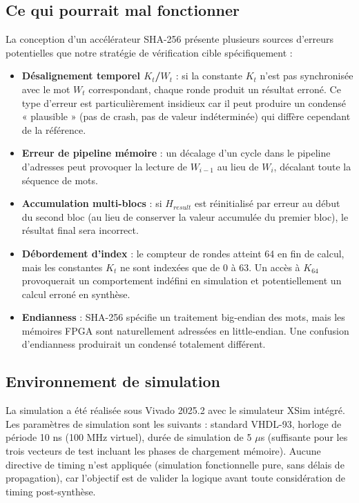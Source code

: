 \subsection{Ce qui pourrait mal fonctionner}

La conception d'un accélérateur SHA-256 présente plusieurs sources d'erreurs potentielles que notre stratégie de vérification cible spécifiquement :

\begin{itemize}
    \item \textbf{Désalignement temporel $K_t$/$W_t$} : si la constante $K_t$ n'est pas synchronisée avec le mot $W_t$ correspondant, chaque ronde produit un résultat erroné. Ce type d'erreur est particulièrement insidieux car il peut produire un condensé « plausible » (pas de crash, pas de valeur indéterminée) qui diffère cependant de la référence.
    \item \textbf{Erreur de pipeline mémoire} : un décalage d'un cycle dans le pipeline d'adresses peut provoquer la lecture de $W_{i-1}$ au lieu de $W_i$, décalant toute la séquence de mots.
    \item \textbf{Accumulation multi-blocs} : si $H_{result}$ est réinitialisé par erreur au début du second bloc (au lieu de conserver la valeur accumulée du premier bloc), le résultat final sera incorrect.
    \item \textbf{Débordement d'index} : le compteur de rondes atteint 64 en fin de calcul, mais les constantes $K_t$ ne sont indexées que de 0 à 63. Un accès à $K_{64}$ provoquerait un comportement indéfini en simulation et potentiellement un calcul erroné en synthèse.
    \item \textbf{Endianness} : SHA-256 spécifie un traitement big-endian des mots, mais les mémoires FPGA sont naturellement adressées en little-endian. Une confusion d'endianness produirait un condensé totalement différent.
\end{itemize}

\subsection{Environnement de simulation}

La simulation a été réalisée sous Vivado 2025.2 avec le simulateur XSim intégré. Les paramètres de simulation sont les suivants : standard VHDL-93, horloge de période 10 ns (100 MHz virtuel), durée de simulation de 5 $\mu$s (suffisante pour les trois vecteurs de test incluant les phases de chargement mémoire). Aucune directive de timing n'est appliquée (simulation fonctionnelle pure, sans délais de propagation), car l'objectif est de valider la logique avant toute considération de timing post-synthèse.

